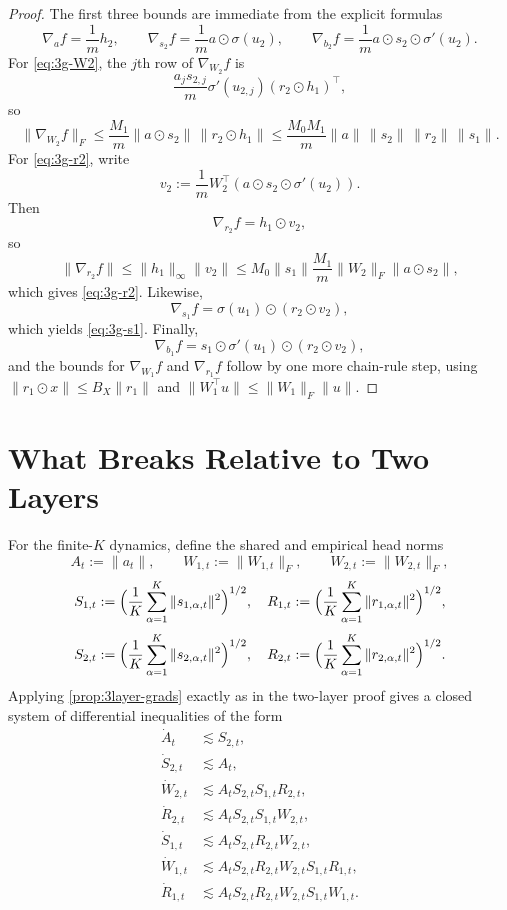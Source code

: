 \documentclass{article}
\theoremstyle{definition}
\begin{document}
\begin{proof}
The first three bounds are immediate from the explicit formulas
\[
  \nabla_a f
  =
  \frac1m h_2,
  \qquad
  \nabla_{s_2} f
  =
  \frac1m a\odot \sigma(u_2),
  \qquad
  \nabla_{b_2} f
  =
  \frac1m a\odot s_2\odot \sigma'(u_2).
\]
For \eqref{eq:3g-W2}, the $j$th row of $\nabla_{W_2}f$ is
\[
  \frac{a_j s_{2,j}}{m}
  \sigma'(u_{2,j})
  (r_2\odot h_1)^\top,
\]
so
\[
  \|\nabla_{W_2}f\|_F
  \le
  \frac{M_1}{m}\|a\odot s_2\|\,\|r_2\odot h_1\|
  \le
  \frac{M_0M_1}{m}
  \|a\|\,\|s_2\|\,\|r_2\|\,\|s_1\|.
\]
For \eqref{eq:3g-r2}, write
\[
  v_2
  :=
  \frac1m W_2^\top(a\odot s_2\odot \sigma'(u_2)).
\]
Then
\[
  \nabla_{r_2}f
  =
  h_1\odot v_2,
\]
so
\[
  \|\nabla_{r_2}f\|
  \le
  \|h_1\|_\infty \|v_2\|
  \le
  M_0\|s_1\|
  \frac{M_1}{m}\|W_2\|_F \|a\odot s_2\|,
\]
which gives \eqref{eq:3g-r2}. Likewise,
\[
  \nabla_{s_1}f
  =
  \sigma(u_1)\odot (r_2\odot v_2),
\]
which yields \eqref{eq:3g-s1}. Finally,
\[
  \nabla_{b_1}f
  =
  s_1\odot \sigma'(u_1)\odot (r_2\odot v_2),
\]
and the bounds for $\nabla_{W_1}f$ and $\nabla_{r_1}f$ follow by one more chain-rule step, using $\|r_1\odot x\|\le B_X\|r_1\|$ and $\|W_1^\top u\|\le \|W_1\|_F\|u\|$.
\end{proof}

\section{What Breaks Relative to Two Layers}

For the finite-$K$ dynamics, define the shared and empirical head norms
\[
  A_t:=\|a_t\|,
  \qquad
  W_{1,t}:=\|W_{1,t}\|_F,
  \qquad
  W_{2,t}:=\|W_{2,t}\|_F,
\]
\[
  S_{1,t}
  :=
  \Bigl(
    \frac1K\sum_{\alpha=1}^K \|s_{1,\alpha,t}\|^2
  \Bigr)^{1/2},
  \quad
  R_{1,t}
  :=
  \Bigl(
    \frac1K\sum_{\alpha=1}^K \|r_{1,\alpha,t}\|^2
  \Bigr)^{1/2},
\]
\[
  S_{2,t}
  :=
  \Bigl(
    \frac1K\sum_{\alpha=1}^K \|s_{2,\alpha,t}\|^2
  \Bigr)^{1/2},
  \quad
  R_{2,t}
  :=
  \Bigl(
    \frac1K\sum_{\alpha=1}^K \|r_{2,\alpha,t}\|^2
  \Bigr)^{1/2}.
\]
Applying \cref{prop:3layer-grads} exactly as in the two-layer proof gives a closed system of differential inequalities of the form
\begin{align}
  \dot A_t
  &\lesssim
  S_{2,t},
  \label{eq:3d-A}
  \\
  \dot S_{2,t}
  &\lesssim
  A_t,
  \label{eq:3d-S2}
  \\
  \dot W_{2,t}
  &\lesssim
  A_t S_{2,t} S_{1,t} R_{2,t},
  \label{eq:3d-W2}
  \\
  \dot R_{2,t}
  &\lesssim
  A_t S_{2,t} S_{1,t} W_{2,t},
  \label{eq:3d-R2}
  \\
  \dot S_{1,t}
  &\lesssim
  A_t S_{2,t} R_{2,t} W_{2,t},
  \label{eq:3d-S1}
  \\
  \dot W_{1,t}
  &\lesssim
  A_t S_{2,t} R_{2,t} W_{2,t} S_{1,t} R_{1,t},
  \label{eq:3d-W1}
  \\
  \dot R_{1,t}
  &\lesssim
  A_t S_{2,t} R_{2,t} W_{2,t} S_{1,t} W_{1,t}.
  \label{eq:3d-R1}
\end{align}
\end{document}
